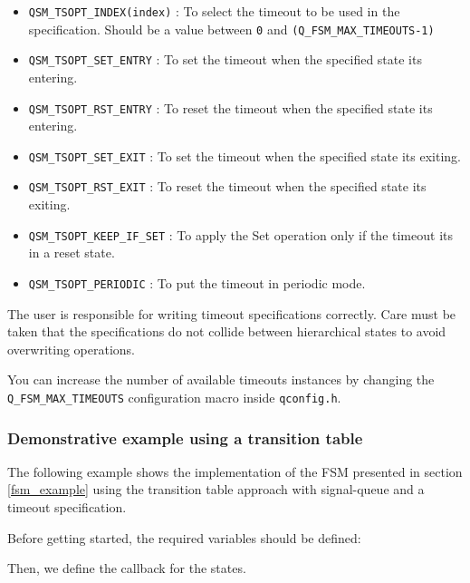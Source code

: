 \begin{itemize}
    \item \lstinline{QSM_TSOPT_INDEX(index)} : To select the timeout to be used in the specification. Should be a value between \lstinline{0} and \lstinline{(Q_FSM_MAX_TIMEOUTS-1)}
    \item \lstinline{QSM_TSOPT_SET_ENTRY} : To set the timeout when the specified state its entering.
    \item \lstinline{QSM_TSOPT_RST_ENTRY} :  To reset the timeout when the specified state its entering.
    \item \lstinline{QSM_TSOPT_SET_EXIT} : To set the timeout when the specified state its exiting.
    \item \lstinline{QSM_TSOPT_RST_EXIT} : To reset the timeout when the specified state its exiting.
    \item \lstinline{QSM_TSOPT_KEEP_IF_SET} : To apply the Set operation only if the timeout its in a reset state.
    \item \lstinline{QSM_TSOPT_PERIODIC} : To put the timeout in periodic mode.
\end{itemize}

\begin{tcolorbox}
\HandRight The user is responsible for writing timeout specifications correctly. Care must be taken that the specifications do not collide between hierarchical states to avoid overwriting operations.
\end{tcolorbox}

\begin{tcolorbox}
\HandRight You can increase the number of available timeouts instances by changing the \lstinline{Q_FSM_MAX_TIMEOUTS} configuration macro inside \lstinline{qconfig.h}. 
\end{tcolorbox}

\subsubsection{Demonstrative example using a transition table}
The following example shows the implementation of the FSM presented in section \ref{fsm_example} using the transition table approach with signal-queue and a timeout specification.

Before getting started, the required variables should be defined: 
\medskip



Then, we define the callback for the states.
\medskip

